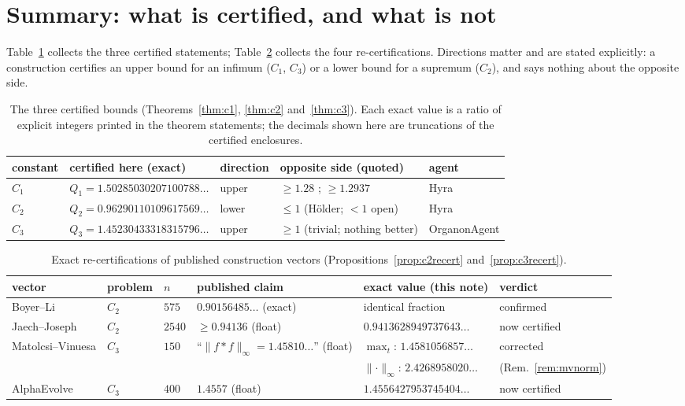 \documentclass[11pt]{article}
\theoremstyle{remark}
\newcommand{\supnorm}[1]{\lVert #1 \rVert_\infty}
\begin{document}
\section{Summary: what is certified, and what is not}\label{sec:summary}

Table~\ref{tab:summary} collects the three certified statements;
Table~\ref{tab:recert} collects the four re-certifications. Directions
matter and are stated explicitly: a construction certifies an upper bound
for an infimum ($C_1$, $C_3$) or a lower bound for a supremum ($C_2$), and
says nothing about the opposite side.

\begin{table}[ht]
\centering\small
\begin{tabular}{@{}lllll@{}}
\toprule
constant & certified here (exact) & direction & opposite side (quoted) & agent \\
\midrule
$C_1$ & $Q_1 = 1.50285030207100788\ldots$ & upper & $\ge 1.28$ \cite{CS17};
$\ge 1.2937$ \cite{KP26} & Hyra \\
$C_2$ & $Q_2 = 0.96290110109617569\ldots$ & lower & $\le 1$ (H\"older;
$<1$ open) & Hyra \\
$C_3$ & $Q_3 = 1.45230433318315796\ldots$ & upper & $\ge 1$ (trivial;
nothing better) & OrganonAgent \\
\bottomrule
\end{tabular}
\caption{The three certified bounds (Theorems~\ref{thm:c1}, \ref{thm:c2} and~\ref{thm:c3}).
Each exact value is a ratio of explicit integers printed in the theorem
statements; the decimals shown here are truncations of the certified
enclosures.}
\label{tab:summary}
\end{table}

\begin{table}[ht]
\centering\footnotesize
\setlength{\tabcolsep}{4.5pt}%
\begin{tabular}{@{}llllll@{}}
\toprule
vector & problem & $n$ & published claim & exact value (this note) & verdict \\
\midrule
Boyer--Li \cite{BoyerLi25} & $C_2$ & $575$ & $0.90156485\ldots$ (exact) &
identical fraction & confirmed \\
Jaech--Joseph \cite{JJ25} & $C_2$ & $2540$ & $\ge 0.94136$ (float) &
$0.9413628949737643\ldots$ & now certified \\
Matolcsi--Vinuesa \cite{MV10} & $C_3$ & $150$ & ``$\supnorm{f*f} =
1.45810\ldots$'' (float) & $\max_t$: $1.4581056857\ldots$ & corrected \\
 & & & & $\supnorm{\cdot}$: $2.4268958020\ldots$ & (Rem.~\ref{rem:mvnorm}) \\
AlphaEvolve \cite{AEresults25} & $C_3$ & $400$ & $1.4557$ (float) &
$1.4556427953745404\ldots$ & now certified \\
\bottomrule
\end{tabular}
\caption{Exact re-certifications of published construction vectors
(Propositions~\ref{prop:c2recert} and~\ref{prop:c3recert}).}
\label{tab:recert}
\end{table}
\end{document}
